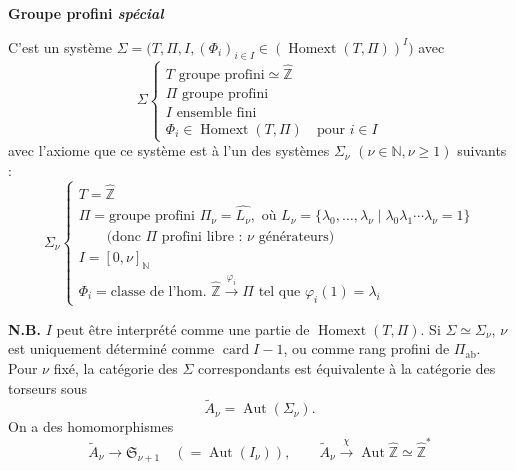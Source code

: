 \documentclass[11pt,a4paper]{article}
\begin{document}
\textbf{Groupe profini \emph{spécial}}

C'est un système
$\Sigma = \bigl(T, \Pi, I, (\Phi_i)_{i \in I} \in (\operatorname{Homext}(T, \Pi))^{I}\bigr)$
avec
\[
  \Sigma
  \begin{cases}
    T \text{ groupe profini} \simeq \hat{\mathbb{Z}} \\
    \Pi \text{ groupe profini} \\
    I \text{ ensemble fini} \\
    \Phi_i \in \operatorname{Homext}(T, \Pi) \quad \text{pour } i \in I
  \end{cases}
\]
avec l'axiome que ce système est \struck{\ill{}}  à l'un des
systèmes $\Sigma_\nu$ $(\nu \in \mathbb{N}, \nu \geqslant 1)$ suivants :
\[
  \Sigma_\nu
  \begin{cases}
    T = \hat{\mathbb{Z}} \\
    \Pi = \text{groupe profini } \Pi_\nu = \widehat{L_\nu}, \text{ où }
      L_\nu = \{\lambda_0, \ldots, \lambda_\nu \mid \lambda_0 \lambda_1 \cdots \lambda_\nu = 1\} \\
    \qquad \text{(donc $\Pi$ profini libre : $\nu$ générateurs)} \\
    I = [0, \nu]_{\mathbb{N}} \\
    \Phi_i = \text{classe de l'hom. } \hat{\mathbb{Z}} \xrightarrow{\varphi_i} \Pi
      \text{ tel que } \varphi_i(1) = \lambda_i
  \end{cases}
\]

\textbf{N.B.} $I$ peut être interprété comme une partie de
$\operatorname{Homext}(T, \Pi)$. Si $\Sigma \simeq \Sigma_\nu$, $\nu$ est
uniquement déterminé comme $\operatorname{card} I - 1$, ou
\struck{\ill{}}  comme rang profini de $\Pi_{\mathrm{ab}}$.
Pour $\nu$ fixé, la catégorie des $\Sigma$ correspondants est équivalente à la
catégorie des torseurs sous
\[
  \widetilde{A}_\nu = \operatorname{Aut}(\Sigma_\nu) .
\]
On a des homomorphismes
\[
  \widetilde{A}_\nu \longrightarrow \mathfrak{S}_{\nu+1} \quad (= \operatorname{Aut}(I_\nu)),
  \qquad
  \widetilde{A}_\nu \xrightarrow{\ \chi\ } \operatorname{Aut} \hat{\mathbb{Z}} \simeq \hat{\mathbb{Z}}^{*}
\]
\end{document}
